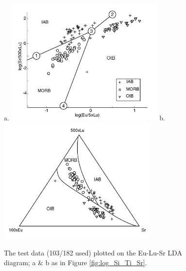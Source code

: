 \begin{figure}[htbp]
  \centering
a.  \includegraphics[width=300]{figures/log_Eu_Lu_Sr_lin.jpg}
b.  \includegraphics[width=300]{figures/test_Eu_Lu_Sr_lin.jpg}
  \caption[The test data plotted on the Eu-Lu-Sr diagram]
{The test data (103/182 used)  plotted on the Eu-Lu-Sr LDA diagram;  a
\& b as in Figure \ref{fig:log_Si_Ti_Sr}.}
  \label{fig:log_Eu_Lu_Sr}
\end{figure}

